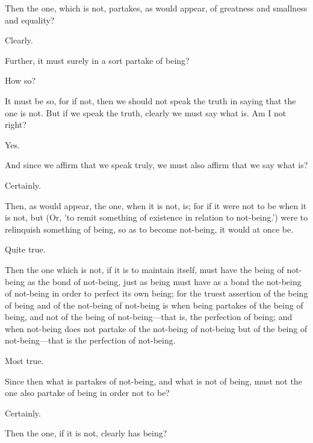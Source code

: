 \documentclass[11pt,letter]{article}
\begin{document}
\par  Then the one, which is not, partakes, as would appear, of greatness and smallness and equality?

\par  Clearly.

\par  Further, it must surely in a sort partake of being?

\par  How so?

\par  It must be so, for if not, then we should not speak the truth in saying that the one is not. But if we speak the truth, clearly we must say what is. Am I not right?

\par  Yes.

\par  And since we affirm that we speak truly, we must also affirm that we say what is?

\par  Certainly.

\par  Then, as would appear, the one, when it is not, is; for if it were not to be when it is not, but (Or, 'to remit something of existence in relation to not-being.') were to relinquish something of being, so as to become not-being, it would at once be.

\par  Quite true.

\par  Then the one which is not, if it is to maintain itself, must have the being of not-being as the bond of not-being, just as being must have as a bond the not-being of not-being in order to perfect its own being; for the truest assertion of the being of being and of the not-being of not-being is when being partakes of the being of being, and not of the being of not-being—that is, the perfection of being; and when not-being does not partake of the not-being of not-being but of the being of not-being—that is the perfection of not-being.

\par  Most true.

\par  Since then what is partakes of not-being, and what is not of being, must not the one also partake of being in order not to be?

\par  Certainly.

\par  Then the one, if it is not, clearly has being?
\end{document}
